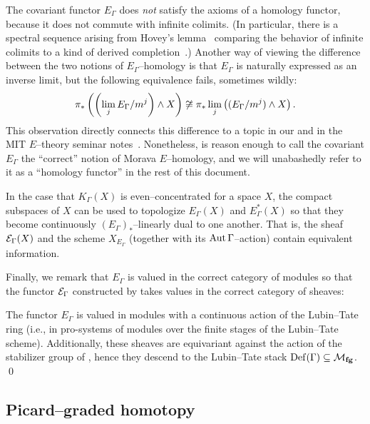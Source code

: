 \begin{remark}
The covariant functor $E_\Gamma$ does \emph{not} satisfy the axioms of a homology functor, because it does not commute with infinite colimits.  (In particular, there is a spectral sequence arising from Hovey's lemma~\cite[Lemma 2.3]{HoveyCSC} comparing the behavior of infinite colimits to a kind of derived completion~\cite{HoveyFilteredColimits}.)  Another way of viewing the difference between the two notions of $E_\Gamma$--homology is that $E_\Gamma$ is naturally expressed as an inverse limit, but the following equivalence fails, sometimes wildly: \[\pi_* \left(\left(\lim_j E_\Gamma / m^j\right) \wedge X\right) \not\cong \pi_* \lim_j \left( (E_\Gamma / m^j) \wedge X \right).\] This observation directly connects this difference to a topic in our  and in the MIT $E$--theory seminar notes~\cite[Section 14]{MITETheory}.  Nonetheless,  is reason enough to call the covariant $E_\Gamma$ the ``correct'' notion of Morava $E$--homology, and we will unabashedly refer to it as a ``homology functor'' in the rest of this document.
\end{remark}

\begin{remark}
In the case that $K_\Gamma(X)$ is even--concentrated for a space $X$, the compact subspaces of $X$ can be used to topologize $E_\Gamma(X)$ and $E_\Gamma^*(X)$ so that they become continuously $(E_\Gamma)_*$--linearly dual to one another.  That is, the sheaf $\mathcal{E}_\Gamma(X)$ and the scheme $X_{E_\Gamma}$ (together with its $\operatorname{Aut} \Gamma$--action) contain equivalent information.
\end{remark}

Finally, we remark that $E_\Gamma$ is valued in the correct category of modules so that the functor $\mathcal{E}_\Gamma$ constructed by  takes values in the correct category of sheaves:
\begin{lemma}\label{EthyGivesASheaf}
The functor $E_\Gamma$ is valued in modules with a continuous action of the Lubin--Tate ring (i.e., in pro-systems of modules over the finite stages of the Lubin--Tate scheme).  Additionally, these sheaves are equivariant against the action of the stabilizer group of , hence they descend to the Lubin--Tate stack $\operatorname{Def}(\Gamma) \subseteq \mathcal{M}_{\mathbf{fg}}$. \qed
\end{lemma}


\subsection{Picard--graded homotopy}\label{SectionPicardGradedHomotopy}

